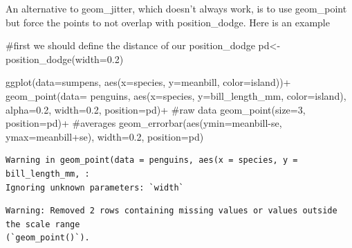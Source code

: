 \documentclass[
  letterpaper,
  DIV=11,
  numbers=noendperiod]{scrartcl}
\newenvironment{Shaded}{\begin{snugshade}}{\end{snugshade}}
\newcommand{\AttributeTok}[1]{\textcolor[rgb]{0.40,0.45,0.13}{#1}}
\newcommand{\CommentTok}[1]{\textcolor[rgb]{0.37,0.37,0.37}{#1}}
\newcommand{\DecValTok}[1]{\textcolor[rgb]{0.68,0.00,0.00}{#1}}
\newcommand{\FloatTok}[1]{\textcolor[rgb]{0.68,0.00,0.00}{#1}}
\newcommand{\FunctionTok}[1]{\textcolor[rgb]{0.28,0.35,0.67}{#1}}
\newcommand{\NormalTok}[1]{\textcolor[rgb]{0.00,0.23,0.31}{#1}}
\newcommand{\OtherTok}[1]{\textcolor[rgb]{0.00,0.23,0.31}{#1}}
\newcommand{\SpecialCharTok}[1]{\textcolor[rgb]{0.37,0.37,0.37}{#1}}
\begin{document}
An alternative to geom\_jitter, which doesn't always work, is to use
geom\_point but force the points to not overlap with position\_dodge.
Here is an example

\begin{Shaded}
\begin{Highlighting}[]
\CommentTok{\#first we should define the distance of our position\_dodge}
\NormalTok{pd}\OtherTok{\textless{}{-}}\FunctionTok{position\_dodge}\NormalTok{(}\AttributeTok{width=}\FloatTok{0.2}\NormalTok{)}

\FunctionTok{ggplot}\NormalTok{(}\AttributeTok{data=}\NormalTok{sumpens, }\FunctionTok{aes}\NormalTok{(}\AttributeTok{x=}\NormalTok{species, }\AttributeTok{y=}\NormalTok{meanbill, }\AttributeTok{color=}\NormalTok{island))}\SpecialCharTok{+}
  \FunctionTok{geom\_point}\NormalTok{(}\AttributeTok{data=}\NormalTok{ penguins, }\FunctionTok{aes}\NormalTok{(}\AttributeTok{x=}\NormalTok{species, }\AttributeTok{y=}\NormalTok{bill\_length\_mm, }\AttributeTok{color=}\NormalTok{island), }\AttributeTok{alpha=}\FloatTok{0.2}\NormalTok{, }\AttributeTok{width=}\FloatTok{0.2}\NormalTok{, }\AttributeTok{position=}\NormalTok{pd)}\SpecialCharTok{+} \CommentTok{\#raw data}
  \FunctionTok{geom\_point}\NormalTok{(}\AttributeTok{size=}\DecValTok{3}\NormalTok{, }\AttributeTok{position=}\NormalTok{pd)}\SpecialCharTok{+} \CommentTok{\#averages}
  \FunctionTok{geom\_errorbar}\NormalTok{(}\FunctionTok{aes}\NormalTok{(}\AttributeTok{ymin=}\NormalTok{meanbill}\SpecialCharTok{{-}}\NormalTok{se, }\AttributeTok{ymax=}\NormalTok{meanbill}\SpecialCharTok{+}\NormalTok{se), }\AttributeTok{width=}\FloatTok{0.2}\NormalTok{, }\AttributeTok{position=}\NormalTok{pd)}
\end{Highlighting}
\end{Shaded}

\begin{verbatim}
Warning in geom_point(data = penguins, aes(x = species, y = bill_length_mm, :
Ignoring unknown parameters: `width`
\end{verbatim}

\begin{verbatim}
Warning: Removed 2 rows containing missing values or values outside the scale range
(`geom_point()`).
\end{verbatim}
\end{document}

